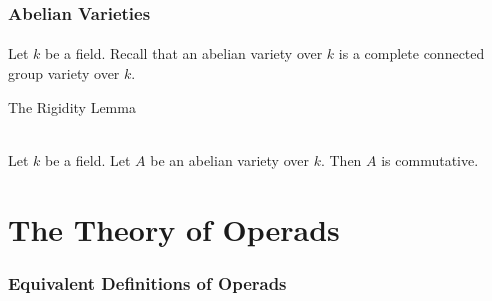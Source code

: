 \documentclass[a4paper]{article}
\begin{document}
\section{Abelian Varieties}
\subsection{}
Let $k$ be a field. Recall that an abelian variety over $k$ is a complete connected group variety over $k$. 

\begin{thm}{The Rigidity Lemma}{}\\
\end{thm}

\begin{crl}{}{}\\
Let $k$ be a field. Let $A$ be an abelian variety over $k$. Then $A$ is commutative. 
\end{crl}

\pagebreak

\part{The Theory of Operads}

\pagebreak
\section{Equivalent Definitions of Operads}
\end{document}
